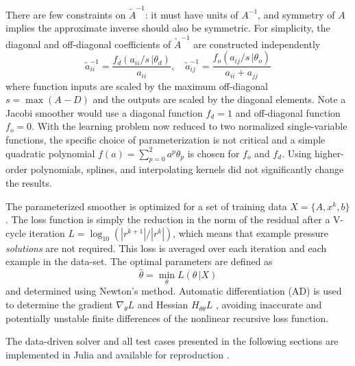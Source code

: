 \documentclass[review]{elsarticle}
\begin{document}
There are few constraints on $\tilde A^{-1}$: it must have units of $A^{-1}$, and symmetry of $A$ implies the approximate inverse should also be symmetric. For simplicity, the diagonal and off-diagonal coefficients of $\tilde A^{-1}$ are constructed independently 
\begin{equation}\label{eq:approxinv}
    \tilde a^{-1}_{ii} = \frac{f_d(a_{ii}/s\,|\theta_d)}{a_{ii}} , \quad
    \tilde a^{-1}_{ij} = \frac{f_o(a_{ij}/s\,|\theta_o)}{a_{ii}+a_{jj}}
\end{equation}
where function inputs are scaled by the maximum off-diagonal $s=\max(A-D)$ and the outputs are scaled by the diagonal elements. Note a Jacobi smoother would use a diagonal function $f_d=1$ and off-diagonal function $f_o=0$. With the learning problem now reduced to two normalized single-variable functions, the specific choice of parameterization is not critical and a simple quadratic polynomial $f(a) = \sum_{p=0}^2 a^p \theta_p$ is chosen for $f_o$ and $f_d$. Using higher-order polynomials, splines, and interpolating kernels did not significantly change the results.

The parameterized smoother is optimized for a set of training data $X=\{A,x^k,b\}$. The loss function is simply the reduction in the norm of the residual after a V-cycle iteration $L = \log_{10}(|r^{k+1}| / |r^{k}|)$, which means that example pressure \textit{solutions} are not required. This loss is averaged over each iteration and each example in the data-set. The optimal parameters are defined as
\begin{equation}
    \hat\theta = \min_\theta L(\theta\, |X)
\end{equation}
and determined using Newton's method. Automatic differentiation (AD) is used to determine the gradient $\nabla_\theta L$ and Hessian $H_{\theta\theta} L$ \cite{RevelsLubinPapamarkou2016}, avoiding inaccurate and potentially unstable finite differences of the nonlinear recursive loss function.

The data-driven solver and all test cases presented in the following sections are implemented in Julia and available for reproduction \cite{bezanson2017julia,weymouth2021julia}.
\end{document}
